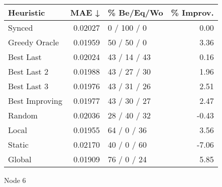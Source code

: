 \begin{tabular}{lrlr}
\toprule
\textbf{Heuristic} & \textbf{MAE ↓} & \textbf{\% Be/Eq/Wo} & \textbf{\% Improv.} \\
\midrule
            Synced &        0.02027 &          0 / 100 / 0 &                0.00 \\
     Greedy Oracle &        0.01959 &          50 / 50 / 0 &                3.36 \\
         Best Last &        0.02024 &         43 / 14 / 43 &                0.16 \\
       Best Last 2 &        0.01988 &         43 / 27 / 30 &                1.96 \\
       Best Last 3 &        0.01976 &         43 / 31 / 26 &                2.51 \\
    Best Improving &        0.01977 &         43 / 30 / 27 &                2.47 \\
            Random &        0.02036 &         28 / 40 / 32 &               -0.43 \\
             Local &        0.01955 &          64 / 0 / 36 &                3.56 \\
            Static &        0.02170 &          40 / 0 / 60 &               -7.06 \\
            Global &        0.01909 &          76 / 0 / 24 &                5.85 \\
\bottomrule
\end{tabular}
\caption{Node 6}
\label{tab:non_lr01_le1_bs4_6}
